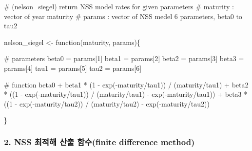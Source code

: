 \documentclass[
  a4paper,
  DIV=11,
  numbers=noendperiod]{scrreprt}
\newenvironment{Shaded}{\begin{snugshade}}{\end{snugshade}}
\newcommand{\CommentTok}[1]{\textcolor[rgb]{0.37,0.37,0.37}{#1}}
\newcommand{\ControlFlowTok}[1]{\textcolor[rgb]{0.00,0.23,0.31}{#1}}
\newcommand{\DecValTok}[1]{\textcolor[rgb]{0.68,0.00,0.00}{#1}}
\newcommand{\FunctionTok}[1]{\textcolor[rgb]{0.28,0.35,0.67}{#1}}
\newcommand{\NormalTok}[1]{\textcolor[rgb]{0.00,0.23,0.31}{#1}}
\newcommand{\OtherTok}[1]{\textcolor[rgb]{0.00,0.23,0.31}{#1}}
\newcommand{\SpecialCharTok}[1]{\textcolor[rgb]{0.37,0.37,0.37}{#1}}
\begin{document}
\begin{Shaded}
\begin{Highlighting}[]
\CommentTok{\# (nelson\_siegel) return NSS model rates for given parameters}
\CommentTok{\# maturity : vector of year maturity}
\CommentTok{\# params : vector of NSS medel 6 parameters, beta0 to tau2}

\NormalTok{nelson\_siegel }\OtherTok{\textless{}{-}} \ControlFlowTok{function}\NormalTok{(maturity, params)\{}
  
  \CommentTok{\# parameters }
\NormalTok{  beta0 }\OtherTok{=}\NormalTok{ params[}\DecValTok{1}\NormalTok{]}
\NormalTok{  beta1 }\OtherTok{=}\NormalTok{ params[}\DecValTok{2}\NormalTok{]}
\NormalTok{  beta2 }\OtherTok{=}\NormalTok{ params[}\DecValTok{3}\NormalTok{]}
\NormalTok{  beta3 }\OtherTok{=}\NormalTok{ params[}\DecValTok{4}\NormalTok{]}
\NormalTok{  tau1  }\OtherTok{=}\NormalTok{ params[}\DecValTok{5}\NormalTok{]}
\NormalTok{  tau2  }\OtherTok{=}\NormalTok{ params[}\DecValTok{6}\NormalTok{]}
  
  \CommentTok{\# function }
\NormalTok{  beta0 }\SpecialCharTok{+} 
\NormalTok{    beta1 }\SpecialCharTok{*}\NormalTok{ (}\DecValTok{1} \SpecialCharTok{{-}} \FunctionTok{exp}\NormalTok{(}\SpecialCharTok{{-}}\NormalTok{maturity}\SpecialCharTok{/}\NormalTok{tau1)) }\SpecialCharTok{/}\NormalTok{ (maturity}\SpecialCharTok{/}\NormalTok{tau1) }\SpecialCharTok{+} 
\NormalTok{    beta2 }\SpecialCharTok{*}\NormalTok{ ((}\DecValTok{1} \SpecialCharTok{{-}} \FunctionTok{exp}\NormalTok{(}\SpecialCharTok{{-}}\NormalTok{maturity}\SpecialCharTok{/}\NormalTok{tau1)) }\SpecialCharTok{/}\NormalTok{ (maturity}\SpecialCharTok{/}\NormalTok{tau1) }\SpecialCharTok{{-}} \FunctionTok{exp}\NormalTok{(}\SpecialCharTok{{-}}\NormalTok{maturity}\SpecialCharTok{/}\NormalTok{tau1)) }\SpecialCharTok{+} 
\NormalTok{    beta3 }\SpecialCharTok{*}\NormalTok{ ((}\DecValTok{1} \SpecialCharTok{{-}} \FunctionTok{exp}\NormalTok{(}\SpecialCharTok{{-}}\NormalTok{maturity}\SpecialCharTok{/}\NormalTok{tau2)) }\SpecialCharTok{/}\NormalTok{ (maturity}\SpecialCharTok{/}\NormalTok{tau2) }\SpecialCharTok{{-}} \FunctionTok{exp}\NormalTok{(}\SpecialCharTok{{-}}\NormalTok{maturity}\SpecialCharTok{/}\NormalTok{tau2)) }
  
\NormalTok{\}}
\end{Highlighting}
\end{Shaded}

\subsubsection*{2. NSS 최적해 산출 함수(finite difference
method)}\label{nss-uxcd5cuxc801uxd574-uxc0b0uxcd9c-uxd568uxc218finite-difference-method}
\end{document}
